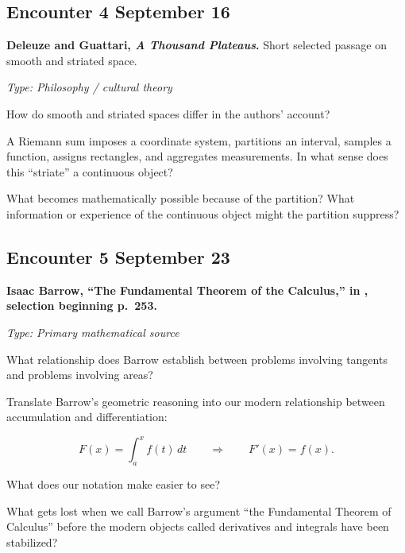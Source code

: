 \subsection*{Encounter 4 \hfill September 16}

\textbf{Deleuze and Guattari, \emph{A Thousand Plateaus}.}
Short selected passage on smooth and striated space.

\textit{Type: Philosophy / cultural theory}

\begin{description}[leftmargin=1.15in,style=nextline]
\item[\textcolor{LangRed}{READ}]
How do smooth and striated spaces differ in the authors' account?
\item[\textcolor{LangRed}{CONNECT}]
A Riemann sum imposes a coordinate system, partitions an interval, samples a
function, assigns rectangles, and aggregates measurements. In what sense does
this ``striate'' a continuous object?
\item[\textcolor{LangRed}{QUESTION}]
What becomes mathematically possible because of the partition? What information
or experience of the continuous object might the partition suppress?
\end{description}

\subsection*{Encounter 5 \hfill September 23}

\textbf{Isaac Barrow, ``The Fundamental Theorem of the Calculus,''
in \textcite{struik1986}, selection beginning p.~253.}

\textit{Type: Primary mathematical source}

\begin{description}[leftmargin=1.15in,style=nextline]

\item[\textcolor{LangRed}{READ}]
What relationship does Barrow establish between problems involving
tangents and problems involving areas?

\item[\textcolor{LangRed}{CONNECT}]
Translate Barrow's geometric reasoning into our modern relationship
between accumulation and differentiation:

\[
F(x)=\int_a^x f(t)\,dt
\qquad\Longrightarrow\qquad
F'(x)=f(x).
\]

What does our notation make easier to see?

\item[\textcolor{LangRed}{QUESTION}]
What gets lost when we call Barrow's argument ``the Fundamental
Theorem of Calculus'' before the modern objects called derivatives
and integrals have been stabilized?

\end{description}

